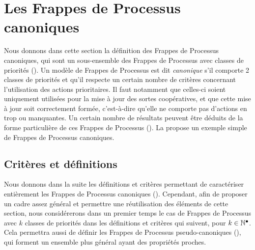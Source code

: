 
\section{Les Frappes de Processus canoniques}

Nous donnons dans cette section la définition des Frappes de Processus canoniques,
qui sont un sous-ensemble des Frappes de Processus avec classes de priorités
().
Un modèle de Frappes de Processus est dit \emph{canonique} s'il comporte 2 classes de priorités
et qu'il respecte un certain nombre de critères concernant l'utilisation des actions prioritaires.
Il faut notamment que celles-ci soient uniquement utilisées pour la mise à jour des sortes
coopératives, et que cette mise à jour soit correctement formée,
c'est-à-dire qu'elle ne comporte pas d'actions en trop ou manquantes.
Un certain nombre de résultats peuvent être déduits de la forme particulière de ces
Frappes de Processus ().
La  propose un exemple simple de Frappes de Processus canoniques.




\subsection{Critères et définitions}

Nous donnons dans la suite les définitions et critères permettant de caractériser entièrement
les Frappes de Processus canoniques ().
Cependant, afin de proposer un cadre assez général et permettre une réutilisation des éléments
de cette section,
nous considérerons dans un premier temps le cas de Frappes de Processus avec $k$
classes de priorités dans les définitions et critères qui suivent, pour $k \in \mathbb{N}^\bullet$.
Cela permettra aussi de définir les Frappes de Processus pseudo-canoniques
(),
qui forment un ensemble plus général ayant des propriétés proches.

\myskip

